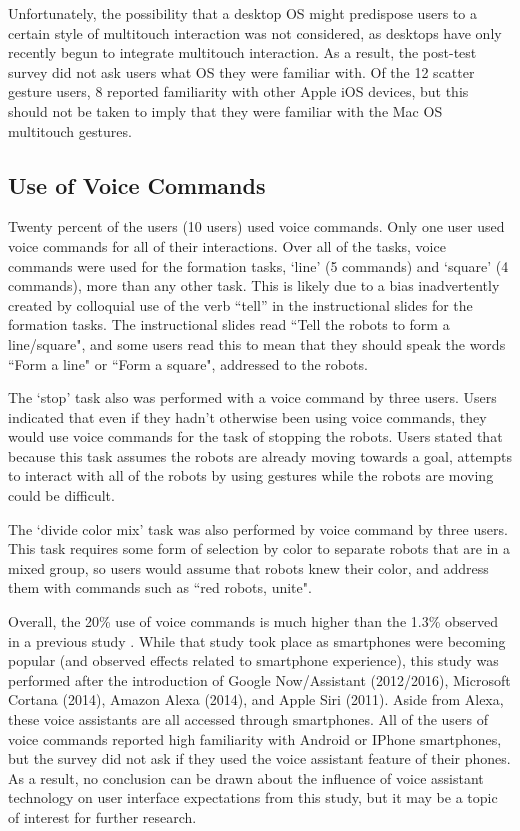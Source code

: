 Unfortunately, the possibility that a desktop OS might predispose users to a certain style of multitouch interaction was not considered, as desktops have only recently begun to integrate multitouch interaction.
As a result, the post-test survey did not ask users what OS they were familiar with. Of the 12 scatter gesture users, 8 reported familiarity with other Apple iOS devices, but this should not be taken to imply that they were familiar with the Mac OS multitouch gestures. 

\subsection{Use of Voice Commands}

Twenty percent of the users (10 users) used voice commands. 
Only one user used voice commands for all of their interactions. 
Over all of the tasks, voice commands were used for the formation tasks, `line' (5 commands) and `square' (4 commands), more than any other task. 
This is likely due to a bias inadvertently created by colloquial use of the verb ``tell'' in the instructional slides for the formation tasks.  
The instructional slides read ``Tell the robots to form a line/square", and some users read this to mean that they should speak the words ``Form a line" or ``Form a square", addressed to the robots.

The `stop' task also was performed with a voice command by three users. 
Users indicated that even if they hadn't otherwise been using voice commands, they would use voice commands for the task of stopping the robots. 
Users stated that because this task assumes the robots are already moving towards a goal, attempts to interact with all of the robots by using gestures while the robots are moving could be difficult. 

The `divide color mix' task was also performed by voice command by three users. 
This task requires some form of selection by color to separate robots that are in a mixed group, so users would assume that robots knew their color, and address them with commands such as ``red robots, unite".

Overall, the 20\% use of voice commands is much higher than the 1.3\% observed in a previous study \citep{micire2010multi}. 
While that study took place as smartphones were becoming popular (and observed effects related to smartphone experience), this study was performed after the introduction of Google Now/Assistant (2012/2016), Microsoft Cortana (2014), Amazon Alexa (2014), and Apple Siri (2011). 
Aside from Alexa, these voice assistants are all accessed through smartphones.  
All of the users of voice commands reported high familiarity with Android or IPhone smartphones, but the survey did not ask if they used the voice assistant feature of their phones. 
As a result, no conclusion can be drawn about the influence of voice assistant technology on user interface expectations from this study, but it may be a topic of interest for further research. 

